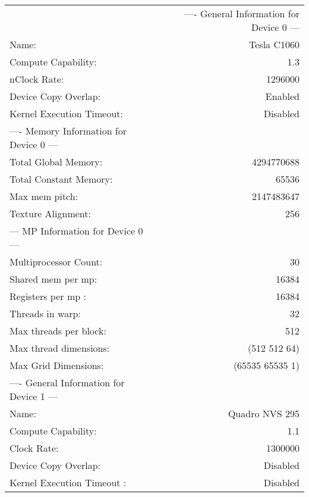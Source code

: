 \documentclass[11pt, twocolumn]{article}
\begin{document}
\begin{tabular}{ l r }
&---- General Information for Device 0 ---                  \\
Name:                      &   Tesla C1060                  \\
Compute Capability:        &   1.3                          \\
nClock Rate:               &   1296000                      \\
Device Copy Overlap:       &   Enabled                      \\
Kernel Execution Timeout:  &   Disabled                     \\

---- Memory Information for Device 0 ---                    \\
Total Global Memory:       &   4294770688                   \\
Total Constant Memory:     &   65536                        \\
Max mem pitch:             &   2147483647                   \\
Texture Alignment:         &   256                          \\

--- MP Information for Device 0 ---                         \\
Multiprocessor Count:      &   30                           \\
Shared mem per mp:         &   16384                        \\
Registers per mp :         &   16384                        \\
Threads in warp:           &   32                           \\
Max threads per block:     &   512                          \\
Max thread dimensions:     &   (512 512 64)                 \\
Max Grid Dimensions:       &   (65535 65535 1)              \\

---- General Information for Device 1 ---                   \\
Name:                      &   Quadro NVS 295               \\
Compute Capability:        &   1.1                          \\
Clock Rate:                &   1300000                      \\
Device Copy Overlap:       &   Disabled                     \\
Kernel Execution Timeout : &   Disabled                     \\


\end{tabular}
\end{document}

